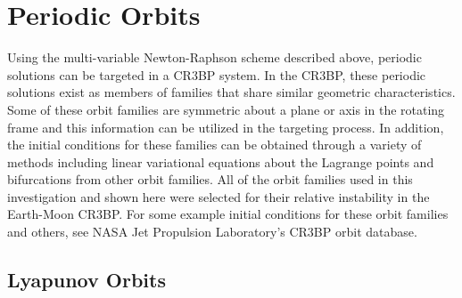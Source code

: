 \section{Periodic Orbits}
Using the multi-variable Newton-Raphson scheme described above, periodic solutions can be targeted
in a CR3BP system. In the CR3BP, these periodic solutions exist as members of families that share
similar geometric characteristics. Some of these orbit families are symmetric about a plane or axis
in the rotating frame and this information can be utilized in the targeting process. In addition,
the initial conditions for these families can be obtained through a variety of methods including
linear variational equations about the Lagrange points and bifurcations from other orbit families.
All of the orbit families used in this investigation and shown here were selected for their
relative instability in the Earth-Moon CR3BP. For some example initial conditions for these orbit
families and others, see NASA Jet Propulsion Laboratory's CR3BP orbit database\cite{Park}.

\subsection{Lyapunov Orbits}
